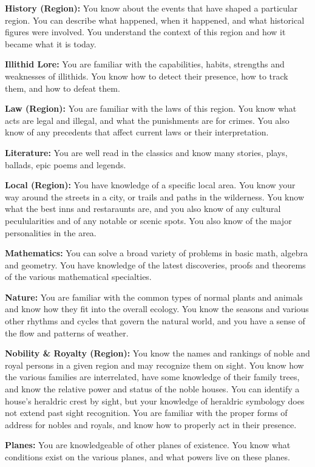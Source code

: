 \begin{itemize*}
	\item \textbf{History (Region):} You know about the events that have shaped a particular region. You can describe what happened, when it happened, and what historical figures were involved. You understand the context of this region and how it became what it is today.
	\item \textbf{Illithid Lore:} You are familiar with the capabilities, habits, strengths and weaknesses of illithids. You know how to detect their presence, how to track them, and how to defeat them.
	\item \textbf{Law (Region):} You are familiar with the laws of this region. You know what acts are legal and illegal, and what the punishments are for crimes. You also know of any precedents that affect current laws or their interpretation.
	\item \textbf{Literature:} You are well read in the classics and know many stories, plays, ballads, epic poems and legends.
	\item \textbf{Local (Region):} You have knowledge of a specific local area. You know your way around the streets in a city, or trails and paths in the wilderness. You know what the best inns and restaraunts are, and you also know of any cultural peculularities and of any notable or scenic spots. You also know of the major personalities in the area.
	\item \textbf{Mathematics:} You can solve a broad variety of problems in basic math, algebra and geometry. You have knowledge of the latest discoveries, proofs and theorems of the various mathematical specialties.
	\item \textbf{Nature:} You are familiar with the common types of normal plants and animals and know how they fit into the overall ecology. You know the seasons and various other rhythms and cycles that govern the natural world, and you have a sense of the flow and patterns of weather.
	\item \textbf{Nobility \& Royalty (Region):} You know the names and rankings of noble and royal persons in a given region and may recognize them on sight. You know how the various families are interrelated, have some knowledge of their family trees, and know the relative power and status of the noble houses. You can identify a house's heraldric crest by sight, but your knowledge of heraldric symbology does not extend past sight recognition. You are familiar with the proper forms of address for nobles and royals, and know how to properly act in their presence.
	\item \textbf{Planes:} You are knowledgeable of other planes of existence. You know what conditions exist on the various planes, and what powers live on these planes.

\end{itemize*}
